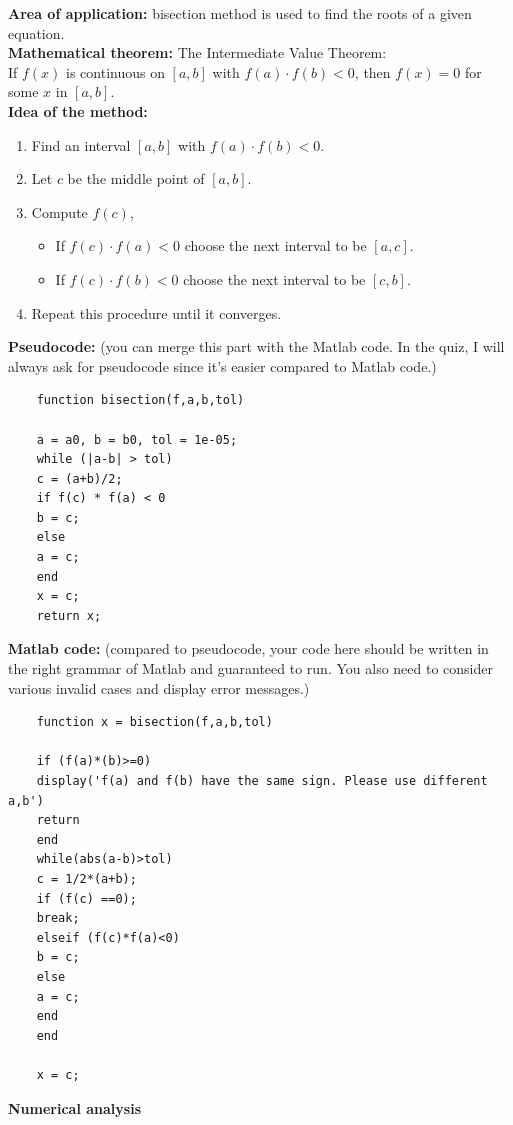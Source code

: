 \documentclass{article}
\begin{document}
	{\bf Area of application:} bisection method is used to find the roots of a given equation.\\
	
	{\bf Mathematical theorem:} The Intermediate Value Theorem: \\[0.1in]
	If $f(x)$ is continuous on $[a,b]$ with $f(a)\cdot f(b)<0$, then $f(x) = 0$ for some $x$ in $[a,b]$.\\
	
	{\bf Idea of the method:} 
	\begin{enumerate}
		\item Find an interval $[a,b]$ with $f(a)\cdot f(b)<0$.
		\item Let $c$ be the middle point of $[a,b]$.
		\item Compute $f(c)$,
		\begin{itemize}
			\item If $f(c)\cdot f(a) <0$ choose the next interval to be $[a,c]$.
			\item If $f(c)\cdot f(b) <0$ choose the next interval to be $[c,b]$.
		\end{itemize}
		\item Repeat this procedure until it converges.
	\end{enumerate}
	{\bf Pseudocode:} (you can merge this part with the Matlab code. In the quiz, I will always ask for pseudocode since it's easier compared to Matlab code.)
	\begin{verbatim}
	function bisection(f,a,b,tol)
	
	a = a0, b = b0, tol = 1e-05;
	while (|a-b| > tol)
	c = (a+b)/2;
	if f(c) * f(a) < 0
	b = c;
	else
	a = c;
	end
	x = c;
	return x;
	\end{verbatim}
	{\bf Matlab code:} (compared to pseudocode, your code here should be written in the right grammar of Matlab and guaranteed to run. You also need to consider various invalid cases and display error messages.)
	\begin{verbatim}
	function x = bisection(f,a,b,tol)
	
	if (f(a)*(b)>=0)
	display('f(a) and f(b) have the same sign. Please use different a,b')
	return
	end
	while(abs(a-b)>tol)
	c = 1/2*(a+b);
	if (f(c) ==0);
	break;
	elseif (f(c)*f(a)<0)
	b = c;
	else
	a = c;
	end
	end
	
	x = c;
	\end{verbatim}
	{\bf Numerical analysis}
\end{document}
